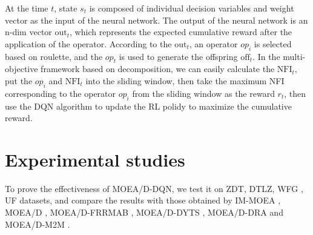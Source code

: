 \documentclass[journal]{IEEEtran}
\newcommand{\TODO}[1]{\textcolor[rgb]{1.00,0.40,0.22}{#1}}
\begin{document}
At the time $t$, state $s_t$ is composed of individual decision variables and weight vector as the input of the neural network. The output of the neural network is an n-dim vector $\text{out}_t$, which represents the expected cumulative reward after the application of the operator.
According to the $\text{out}_t$, an operator $op_i$ is selected based on roulette, and the $op_t$ is used to generate the offspring $\text{off}_t$. In the multi-objective framework based on decomposition, we can easily calculate the $\text{NFI}_t$, put the $op_i$ and $\text{NFI}_t$ into the sliding window, then take the maximum NFI corresponding to the operator $op_i$ from the sliding window as the reward $r_t$, then use the DQN algorithm to update the RL polidy to maximize the cumulative reward.



\section{Experimental studies}
To prove the effectiveness of MOEA/D-DQN, we test it on ZDT, DTLZ, WFG , UF datasets, and compare the results with those obtained by IM-MOEA \cite{cheng2015multiobjective}, MOEA/D \cite{moead}, MOEA/D-FRRMAB \cite{frrmab}, MOEA/D-DYTS \cite{aos_dyts}, MOEA/D-DRA \cite{moead-dra} and MOEA/D-M2M \cite{m2m}.
\end{document}
